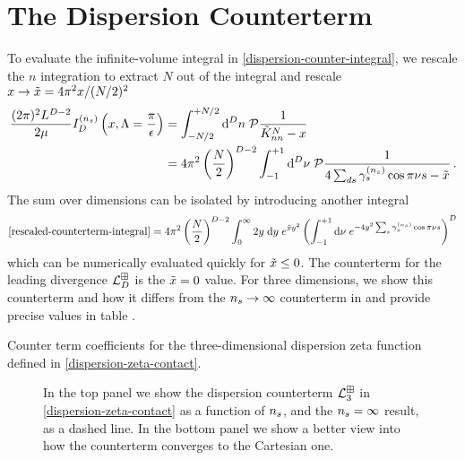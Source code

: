 \section{The Dispersion Counterterm}
\label{sec:dispersion-counterterm}

To evaluate the infinite-volume integral in \eqref{dispersion-counter-integral}, we rescale the $n$ integration to extract $N$ out of the integral and rescale  $x \to \tilde{x} = 4 \pi^2  x/(N/2)^2$
\begin{align}\label{eq:rescaled-counterterm-integral}
	\frac{(2\pi)^2L^{D-2}}{2\mu}
	I_D^{(n_s)}
	\left(x, \Lambda = \frac{\pi}{\epsilon}\right)
	&=
    \int_{-N/2}^{+N/2} \mathrm{d}^Dn\; \mathcal{P} \frac{1}{\tilde K_{nn}^N - x}
    \\ &=
    4\pi^2 \left(\frac{N}{2}\right)^{D-2} \int_{-1}^{+1} \mathrm{d}^D\nu\; \mathcal{P} \frac{1}{4\sum_{ds} \gamma^{({n_s})}_s \cos \pi \nu s - \tilde{x}}
    \, .
\end{align}
The sum over dimensions can be isolated by introducing another integral
\begin{equation}
    \label{eq:dispersion counterterm}
    \eqref{rescaled-counterterm-integral}
    =
    4 \pi^2 \left(\frac{N}{2}\right)^{D-2}\int_{0}^{\infty} 2y\; \mathrm{d}y\; e^{\xtilde y^2}\left(\int_{-1}^{+1} \mathrm{d}\nu\; e^{-4y^2 \sum_s \gamma_s^{(\nstep)} \cos \pi \nu s}\right)^D
\end{equation}
which can be numerically evaluated quickly for $\tilde{x}\leq0$.
The counterterm for the leading divergence $\mathcal{L}_D^{\boxplus}$ is the $\tilde{x}=0$ value.
For three dimensions, we show this counterterm and how it differs from the ${n_s} \to \infty$ counterterm in  and provide precise values in table .
\begin{table}[htb]
    
    \caption{
    	\label{tab:diserpersion-zeta-3d-counterterm-counterterm}
		Counter term coefficients for the three-dimensional dispersion zeta function defined in \eqref{dispersion-zeta-contact}.
    }
\end{table}

\begin{figure}[htb]
    \scalebox{0.9}{}
    \caption{
    	In the top panel we show the dispersion counterterm $\mathcal{L}^{\boxplus}_{3}$ in \eqref{dispersion-zeta-contact} as a function of ${n_s}$, and the ${n_s}=\infty$ result, as a dashed line.
	In the bottom panel we show a better view into how the counterterm converges to the Cartesian one.
    }
    \label{fig:nstep counterterm}
\end{figure}

